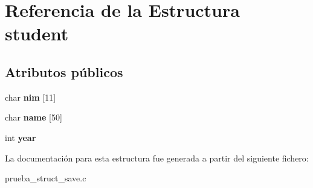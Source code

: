 \hypertarget{structstudent}{}\section{Referencia de la Estructura student}
\label{structstudent}
\subsection*{Atributos públicos}
\begin{DoxyCompactItemize}
\item 
char {\bfseries nim} \mbox{[}11\mbox{]}\hypertarget{structstudent_a6b4a59f7901711fbc1f7ef6fcd9814b7}{}\label{structstudent_a6b4a59f7901711fbc1f7ef6fcd9814b7}

\item 
char {\bfseries name} \mbox{[}50\mbox{]}\hypertarget{structstudent_a1e87c939ac62ff3e55ff80a7512c3fdb}{}\label{structstudent_a1e87c939ac62ff3e55ff80a7512c3fdb}

\item 
int {\bfseries year}\hypertarget{structstudent_a9e941eb7bf8a826384b251b22aeccf24}{}\label{structstudent_a9e941eb7bf8a826384b251b22aeccf24}

\end{DoxyCompactItemize}


La documentación para esta estructura fue generada a partir del siguiente fichero\+:\begin{DoxyCompactItemize}
\item 
prueba\+\_\+struct\+\_\+save.\+c\end{DoxyCompactItemize}
